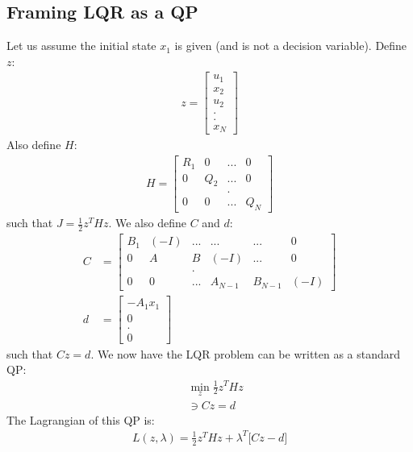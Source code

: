 \subsection{Framing LQR as a QP}
Let us assume the initial state $x_1$ is given (and is not a decision variable). Define $z$: 
\begin{align}
    z = \begin{bmatrix}
       u_1 \\
       x_2 \\
       u_2 \\
       . \\
       . \\
       x_N
    \end{bmatrix}
\end{align}
Also define $H$:
\begin{align}
    H = \begin{bmatrix}
        R_1 & 0   & ... & 0 \\
        0   & Q_2 & ... & 0 \\
        \   & \   & .   & \ \\
        0   & 0   & ... & Q_N
    \end{bmatrix}
\end{align}
such that $J = \frac{1}{2} z^T H z$. We also define $C$ and $d$: 
\begin{align}
    C &= \begin{bmatrix}
        B_1 & (-I)  & ...   & ...   & ...   & 0 \\
        0   & A     & B     & (-I)  & ...   & 0 \\
        \   & \     & .     & \ \\
        0   & 0     & ...   & A_{N-1} & B_{N-1} & (-I)
    \end{bmatrix} \\ 
    d &= \begin{bmatrix}
        -A_1 x_1 \\
        0 \\
        . \\ 
        0 
    \end{bmatrix}
\end{align}
such that $C z = d$. We now have the LQR problem can be written as a standard QP:
\begin{align}
    &\min_{z} \frac{1}{2} z^T H z \\
    \ &\ni C z = d
\end{align}
The Lagrangian of this QP is: 
\begin{align}
    L(z, \lambda) = \frac{1}{2} z^T H z + \lambda^T \big[ C z - d\big]
\end{align}
